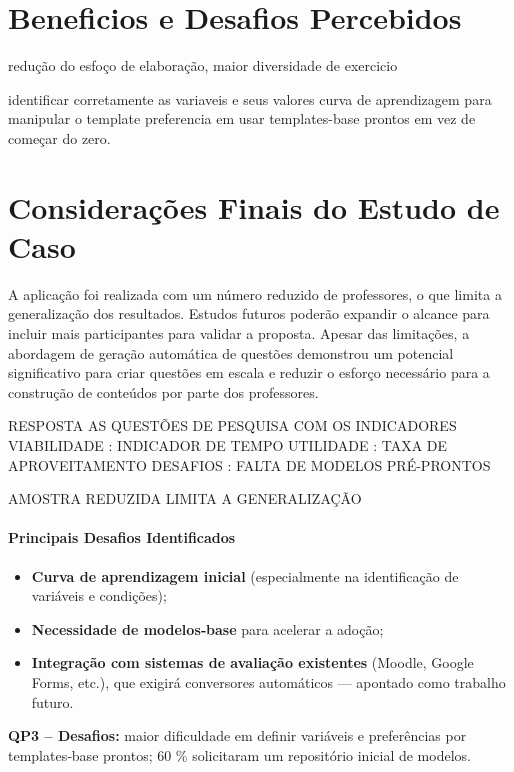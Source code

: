 \section{Beneficios e Desafios Percebidos}

redução do esfoço de elaboração, maior diversidade de exercicio

identificar corretamente as variaveis e seus valores
curva de aprendizagem para manipular o template
preferencia em usar templates-base prontos em vez de começar do zero.

\section{Considerações Finais do Estudo de Caso}
A aplicação foi realizada com um número reduzido de professores, o que limita a generalização dos resultados. Estudos futuros poderão expandir o alcance para incluir mais participantes para validar a proposta. Apesar das limitações, a abordagem de geração automática de questões demonstrou um potencial significativo para criar questões em escala e reduzir o esforço necessário para a construção de conteúdos por parte dos professores.


RESPOSTA AS QUESTÕES DE PESQUISA COM OS INDICADORES 
VIABILIDADE : INDICADOR DE TEMPO
UTILIDADE : TAXA DE APROVEITAMENTO 
DESAFIOS : FALTA DE MODELOS PRÉ-PRONTOS

AMOSTRA REDUZIDA LIMITA A GENERALIZAÇÃO



\paragraph{\textbf{Principais Desafios Identificados}}

\begin{itemize}
    \item \textbf{Curva de aprendizagem inicial} (especialmente na identificação de variáveis e condições);
    \item \textbf{Necessidade de modelos‐base} para acelerar a adoção;
    \item \textbf{Integração com sistemas de avaliação existentes} (Moodle, Google Forms, etc.), que exigirá conversores automáticos — apontado como trabalho futuro.
\end{itemize}
\textbf{QP3 – Desafios:} maior dificuldade em definir variáveis e preferências por templates‐base prontos; 60 \% solicitaram um repositório inicial de modelos. 